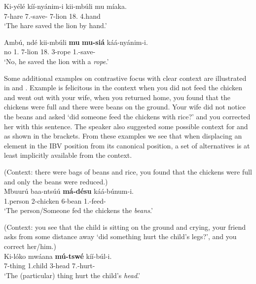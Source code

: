 \documentclass[output=paper,colorlinks,citecolor=brown,
]{langscibook}
\begin{document}
\begin{exe}
    \ex \label{31}
    \begin{xlist}
\ex
\label{31a}
\gll
Ki-yélé kíí-nyánim-i kii-mbúli mu míaka.\\
7-hare 7\Sm{}.\Pst{}-save-\Pst{} 7-lion 18.\Loc{} 4.hand\\
\trans ‘The hare saved the lion by hand.’

\ex
\label{31b}
\gll
Ambú, ndé kii-mbúli \textbf{mu} \textbf{mu-siá} káá-nyánim-i.\\
no 1.\Pro{} 7-lion 18.\Loc{} 3-rope 1\Sm{}.\Pst{}-save-\Pst{}\\
\trans ‘No, he saved the lion with a \textit{rope}.’

    \end{xlist}
\end{exe} 
Some additional examples on contrastive focus with clear context are illustrated in  and . Example  is felicitous in the context when you did not feed the chicken and went out with your wife, when you returned home, you found that the chickens were full and there were beans on the ground. Your wife did not notice the beans and asked `did someone feed the chickens with rice?' and you corrected her with this sentence. The speaker also suggested some possible context for  and  as shown in the brackets. From these examples we see that when displacing an element in the IBV position from its canonical position, a set of alternatives is at least implicitly available from the context.
\begin{exe}
\ex
\label{32}
 (Context: there were bags of beans and rice, you found that the chickens were full and only the beans were reduced.)\\
\gll
Mbuurú baa-ntsúú \textbf{má-désu} káá-búnum-i.\\
1.person 2-chicken 6-bean 1\Sm{}.\Pst{}-feed-\Pst{}\\
\trans ‘The person/Someone fed the chickens the \textit{beans}.’

\end{exe}
\begin{exe}
\ex
\label{33}
 (Context: you see that the child is sitting on the ground and crying, your friend asks from some distance away `did something hurt the child's legs?', and you correct her/him.)\\
\gll
Ki-lóko mwáana \textbf{mú-tswé} kíí-búl-i.\\
7-thing 1.child 3-head 7\Sm{}.\Pst{}-hurt-\Pst{}\\
\trans ‘The (particular) thing hurt the child's \textit{head}.’

\end{exe}
\end{document}
